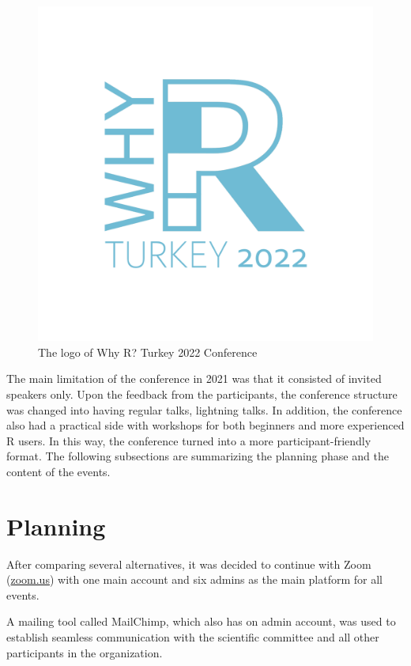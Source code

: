 \begin{figure}[htbp]
  \centering
  \includegraphics[trim={2cm 2cm 2cm 1cm}, scale = 0.6]{logo2022.png}
  \caption{The logo of Why R? Turkey 2022 Conference}
  \label{figure:rlogo}
\end{figure}

\noindent The main limitation of the conference in 2021 was that it consisted of invited speakers only. Upon the feedback from the participants, the conference structure was changed into having regular talks, lightning talks. In addition, the conference also had a practical side with workshops for both beginners and more experienced R users. In this way, the conference turned into a more participant-friendly format. The following subsections are summarizing the planning phase and the content of the events.
\section{Planning}

After comparing several alternatives, it was decided to continue with Zoom (\url{zoom.us}) with one main account and six admins as the main platform for all events.

\noindent A mailing tool called MailChimp, which also has on admin account, was used to establish seamless communication with the scientific committee and all other participants in the organization.

